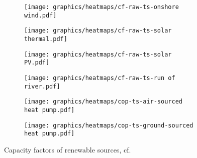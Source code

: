 \clearpage
\begin{figure}
    \centering
        \begin{subfigure}[h]{0.49\textwidth}
            \centering
        \texttt{[image: graphics/heatmaps/cf-raw-ts-onshore wind.pdf]}
    \end{subfigure}
    \begin{subfigure}[h]{0.49\textwidth}
        \centering
        \texttt{[image: graphics/heatmaps/cf-raw-ts-solar thermal.pdf]}
    \end{subfigure}
    \begin{subfigure}[h]{0.49\textwidth}
        \centering
        \texttt{[image: graphics/heatmaps/cf-raw-ts-solar PV.pdf]}
    \end{subfigure}
    \begin{subfigure}[h]{0.49\textwidth}
        \centering
        \texttt{[image: graphics/heatmaps/cf-raw-ts-run of river.pdf]}
    \end{subfigure}
    \begin{subfigure}[h]{0.49\textwidth}
        \centering
        \texttt{[image: graphics/heatmaps/cop-ts-air-sourced heat pump.pdf]}
    \end{subfigure}
    \begin{subfigure}[h]{0.49\textwidth}
        \centering
        \texttt{[image: graphics/heatmaps/cop-ts-ground-sourced heat pump.pdf]}
    \end{subfigure}
    \caption{Capacity factors of renewable sources, cf. \cite{Neumann2022}}
    \label{fig:ren-cfs}
\end{figure}
\clearpage
